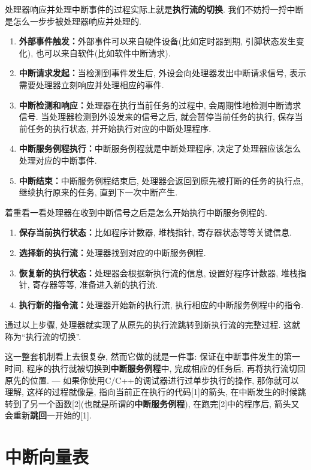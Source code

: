处理器响应并处理中断事件的过程实际上就是\textbf{执行流的切换}. 我们不妨捋一捋中断是怎么一步步被处理器响应并处理的.
\begin{enumerate}
	\item {\bf 外部事件触发：}外部事件可以来自硬件设备(比如定时器到期, 引脚状态发生变化), 也可以来自软件(比如软件中断请求).
	\item {\bf 中断请求发起：}当检测到事件发生后, 外设会向处理器发出中断请求信号, 表示需要处理器立刻响应并处理相应的事件.
	\item {\bf 中断检测和响应：}处理器在执行当前任务的过程中, 会周期性地检测中断请求信号. 当处理器检测到外设发来的信号之后, 就会暂停当前任务的执行, 保存当前任务的执行状态, 并开始执行对应的中断处理程序.
	\item {\bf 中断服务例程执行：}中断服务例程就是中断处理程序, 决定了处理器应该怎么处理对应的中断事件.
	\item {\bf 中断结束：}中断服务例程结束后, 处理器会返回到原先被打断的任务的执行点, 继续执行原来的任务, 直到下一次中断产生.
\end{enumerate}
着重看一看处理器在收到中断信号之后是怎么开始执行中断服务例程的.
\begin{enumerate}
	\item {\bf 保存当前执行状态：}比如程序计数器, 堆栈指针, 寄存器状态等等关键信息.
	\item {\bf 选择新的执行流：}处理器找到对应的中断服务例程.
	\item {\bf 恢复新的执行状态：}处理器会根据新执行流的信息, 设置好程序计数器, 堆栈指针, 寄存器等等, 准备进入新的执行流.
	\item {\bf 执行新的指令流：}处理器开始新的执行流, 执行相应的中断服务例程中的指令.
\end{enumerate}

通过以上步骤, 处理器就实现了从原先的执行流跳转到新执行流的完整过程. 这就称为“执行流的切换”.

这一整套机制看上去很复杂, 然而它做的就是一件事: 保证在中断事件发生的第一时间, 程序的执行就被切换到\textbf{中断服务例程}中, 完成相应的任务后, 再将执行流切回原先的位置. --- 如果你使用C/C++的调试器进行过单步执行的操作, 那你就可以理解, 这样的过程就像是, 指向当前正在执行的代码[1]的箭头, 在中断发生的时候跳转到了另一个函数[2](也就是所谓的\textbf{中断服务例程}), 在跑完[2]中的程序后, 箭头又会重新\textbf{跳回}一开始的[1].

\section{中断向量表}


